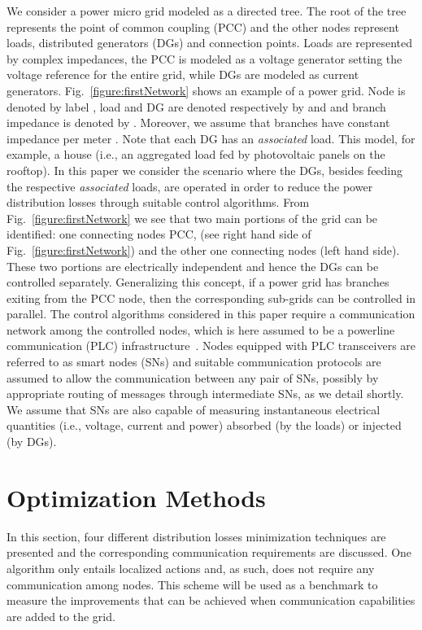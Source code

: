 \documentclass[journal]{IEEEtran}
\newcommand{\fig}[1]{Fig.~\ref{#1}}
\begin{document}
We consider a power micro grid modeled as a directed tree. The root of the tree represents the point of common coupling (PCC) and the other nodes represent loads, distributed generators (DGs) and connection points. Loads are represented by complex impedances, the PCC is modeled as a voltage generator setting the voltage reference for the entire grid, while DGs are modeled as current generators.  \fig{figure:firstNetwork} shows an example of a power grid. Node  is denoted by label , load  and DG  are denoted respectively by  and   and branch impedance  is denoted by . Moreover, we assume that branches have constant impedance per meter \cite{SurroundControl, DORPF}. Note that each DG has an \textit{associated} load. This model, for example, a house (i.e., an aggregated load fed by photovoltaic panels on the rooftop). In this paper we consider the scenario where the DGs, besides feeding the respective \textit{associated} loads,  are operated in order to reduce the power distribution losses through suitable control algorithms. From \fig{figure:firstNetwork} we see that two main portions of the grid can be identified: one connecting nodes {PCC, } (see right hand side of \fig{figure:firstNetwork}) and the other one connecting  nodes {} (left hand side). These two portions are electrically independent and hence the DGs can be controlled separately. Generalizing this concept, if a power grid has  branches exiting from the PCC node, then the corresponding  sub-grids can be controlled in parallel. The control algorithms considered in this paper require a communication network among the controlled nodes, which is here assumed to be a powerline communication (PLC) infrastructure~\cite{Rossi-BC-2013}. Nodes equipped with PLC transceivers are referred to as smart nodes (SNs) and suitable communication protocols are assumed to allow the communication between any pair of SNs, possibly by appropriate routing of messages through intermediate SNs, as we detail shortly. We assume that SNs are also capable of measuring instantaneous electrical quantities (i.e., voltage, current and power) absorbed (by the loads) or injected (by DGs). 



\section{Optimization Methods}
\label{sec:optmethods}

In this section, four different distribution losses minimization techniques are presented and the corresponding communication requirements are discussed. One algorithm only entails localized actions and, as such, does not require any communication among nodes. This scheme will be used as a benchmark to measure the improvements that can be achieved when communication capabilities are added to the grid. 
\end{document}
